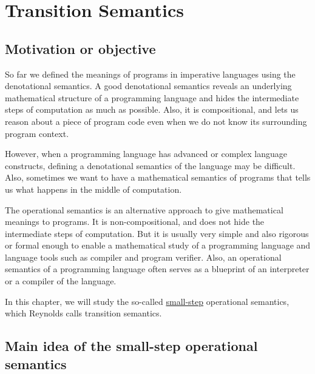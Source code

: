 \chapter{Transition Semantics}

\section{Motivation or objective}

\begin{enumcirc}
	\item
	So far we defined the meanings of programs in imperative languages using the
	denotational semantics.
	A good denotational semantics reveals an underlying mathematical structure of a
	programming language and hides the intermediate steps of computation as much as
	possible.
	Also, it is compositional, and lets us reason about a piece of program code
	even when we do not know its surrounding program context.
	\item
	However, when a programming language has advanced or complex language
	constructs, defining a denotational semantics of the language may be difficult.
	Also, sometimes we want to have a mathematical semantics of programs that tells
	us what happens in the middle of computation.
	\item
	The operational semantics is an alternative approach to give mathematical
	meanings to programs.
	It is non-compositional, and does not hide the intermediate steps of
	computation.
	But it is usually very simple and also rigorous or formal enough to enable a
	mathematical study of a programming language and language tools such as
	compiler and program verifier.
	Also, an operational semantics of a programming language often serves as a
	blueprint of an interpreter or a compiler of the language.
	\item
	In this chapter, we will study the so-called \ul{small-step} operational
	semantics, which Reynolds calls transition semantics.
\end{enumcirc}

\section{Main idea of the small-step operational semantics}


